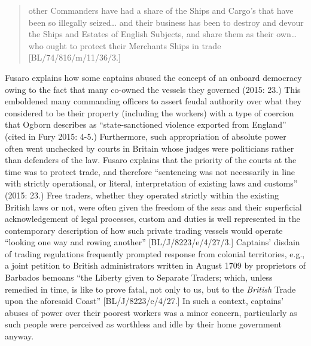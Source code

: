 \begin{quotation}
other Commanders have had a share of the Ships and Cargo’s that have been so illegally seized… and their business has been to destroy and devour the Ships and Estates of English Subjects, and share them as their own… who ought to protect their Merchants Ships in trade [BL/74/816/m/11/36/3.] 

\end{quotation}
\begin{styleStandard}
Fusaro explains how some captains abused the concept of an onboard democracy owing to the fact that many co-owned the vessels they governed (2015: 23.) This emboldened many commanding officers to assert feudal authority over what they considered to be their property (including the workers) with a type of coercion that Ogborn describes as “state-sanctioned violence exported from England” (cited in Fury 2015: 4-5.) Furthermore, such appropriation of absolute power often went unchecked by courts in Britain whose judges were politicians rather than defenders of the law. Fusaro explains that the priority of the courts at the time was to protect trade, and therefore “sentencing was not necessarily in line with strictly operational, or literal, interpretation of existing laws and customs” (2015: 23.) Free traders, whether they operated strictly within the existing British laws or not, were often given the freedom of the seas and their superficial acknowledgement of legal processes, custom and duties is well represented in the contemporary description of how such private trading vessels would operate “looking one way and rowing another” [BL/J/8223/e/4/27/3.] Captains’ disdain of trading regulations frequently prompted response from colonial territories, e.g., a joint petition to British administrators written in August 1709 by proprietors of Barbados bemoans “the Liberty given to Separate Traders; which, unless remedied in time, is like to prove fatal, not only to us, but to the \textit{British} Trade upon the aforesaid Coast” [BL/J/8223/e/4/27.] In such a context, captains’ abuses of power over their poorest workers was a minor concern, particularly as such people were perceived as worthless and idle by their home government anyway. 
\end{styleStandard}


